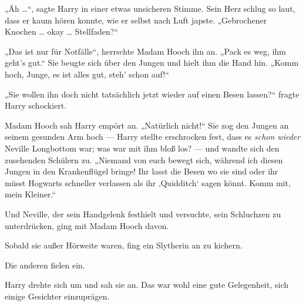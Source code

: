 „Äh …“, sagte Harry in einer etwas unsicheren Stimme. Sein Herz schlug so laut, dass er kaum hören konnte, wie er selbst nach Luft japste.
„Gebrochener Knochen … okay … Stellfaden?“

„Das ist nur für Notfälle“, herrschte Madam Hooch ihn an.
„Pack es weg, ihm geht’s gut.“ Sie beugte sich über den Jungen und hielt ihm die Hand hin.
„Komm hoch, Junge, es ist alles gut, steh’ schon auf!“

„Sie wollen ihn doch nicht tatsächlich jetzt wieder auf einen Besen lassen?“ fragte Harry schockiert.

Madam Hooch sah Harry empört an.
„Natürlich nicht!“ Sie zog den Jungen an seinem gesunden Arm hoch — Harry stellte erschrocken fest, dass es \emph{schon wieder} Neville Longbottom war; was war mit ihm bloß los? — und wandte sich den zusehenden Schülern zu.
„Niemand von euch bewegt sich, während ich diesen Jungen in den Krankenflügel bringe! Ihr lasst die Besen wo sie sind oder ihr müsst Hogwarts schneller verlassen als ihr ‚Quidditch‘ sagen könnt. Komm mit, mein Kleiner.“

Und Neville, der sein Handgelenk festhielt und versuchte, sein Schluchzen zu unterdrücken, ging mit Madam Hooch davon.

Sobald sie außer Hörweite waren, fing ein Slytherin an zu kichern.

Die anderen fielen ein.

Harry drehte sich um und sah sie an. Das war wohl eine gute Gelegenheit, sich einige Gesichter einzuprägen.

